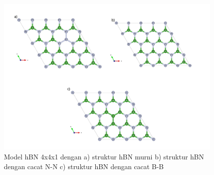 \begin{figure}
    \centering
    \includegraphics[width=0.8\linewidth]{gambar_hasil/structures_all.png}
    \caption{Model hBN 4x4x1 dengan a) struktur hBN murni b) struktur hBN dengan cacat N-N c) struktur hBN dengan cacat B-B}
    \label{fig:enter-label}
\end{figure}

